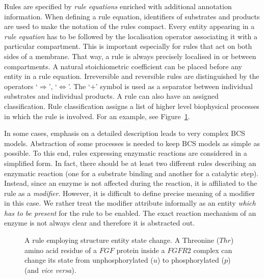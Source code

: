 \documentclass[12pt]{fithesis2}
\begin{document}
Rules are specified by \emph{rule equations} enriched with additional annotation information. When defining a rule equation, identifiers of substrates and products are used to make the notation of the rules compact. Every entity appearing in a \emph{rule equation} has to be followed by the localisation operator associating it with a particular compartment. This is important especially for rules that act on both sides of a membrane. That way, a rule is always precisely localised in or between compartments. A natural stoichiometric coefficient can be placed before any entity in a rule equation. Irreversible and reversible rules are distinguished by the operators `$\Rightarrow$', `$\Leftrightarrow$'. The `$+$' symbol is used as a separator between individual substrates and individual products. A rule can also have an assigned classification. Rule classification assigns a list of higher level biophysical processes in which the rule is involved. For an example, see Figure~\ref{rule_example}.

In some cases, emphasis on a detailed description leads to very complex BCS models. Abstraction of some processes is needed to keep BCS models as simple as possible. To this end, rules expressing enzymatic reactions are considered in a simplified form. In fact, there should be at least two different rules describing an enzymatic reaction (one for a substrate binding and another for a catalytic step). Instead, since an enzyme is not affected during the reaction, it is affiliated to the rule as a \emph{modifier}. However, it is difficult to define precise meaning of a modifier in this case. We rather treat the modifier attribute informally as an entity \emph{which has to be present} for the rule to be enabled. The exact reaction mechanism of an enzyme is not always clear and therefore it is abstracted out.

\begin{figure}[!h]
\begin{center}
\end{center}
\caption{A rule employing structure entity state change. A Threonine ($Thr$) amino acid residue of a $FGF$ protein inside a $FGFR2$ complex can change its state from unphosphorylated ($u$) to phosphorylated ($p$) (and \emph{vice versa}).}\label{rule_example}
\end{figure}
\end{document}
